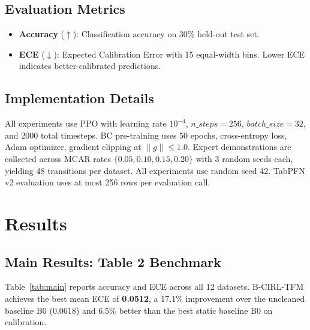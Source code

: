 \documentclass[conference]{IEEEtran}
\begin{document}
\subsection{Evaluation Metrics}

\begin{itemize}
    \item \textbf{Accuracy} ($\uparrow$): Classification accuracy on 30\%
    held-out test set.
    \item \textbf{ECE} ($\downarrow$): Expected Calibration Error with
    15 equal-width bins. Lower ECE indicates better-calibrated predictions.
\end{itemize}

\subsection{Implementation Details}

All experiments use PPO with learning rate $10^{-4}$, $n\_steps=256$,
$batch\_size=32$, and 2000 total timesteps. BC pre-training uses 50 epochs,
cross-entropy loss, Adam optimizer, gradient clipping at $\|g\| \leq 1.0$.
Expert demonstrations are collected across MCAR rates
$\{0.05, 0.10, 0.15, 0.20\}$ with 3 random seeds each, yielding 48
transitions per dataset. All experiments use random seed 42.
TabPFN v2 evaluation uses at most 256 rows per evaluation call.

\section{Results}

\subsection{Main Results: Table 2 Benchmark}

Table~\ref{tab:main} reports accuracy and ECE across all 12 datasets.
B-CIRL-TFM achieves the best mean ECE of \textbf{0.0512}, a 17.1\%
improvement over the uncleaned baseline B0 (0.0618) and 6.5\% better
than the best static baseline B0 on calibration.
\end{document}
